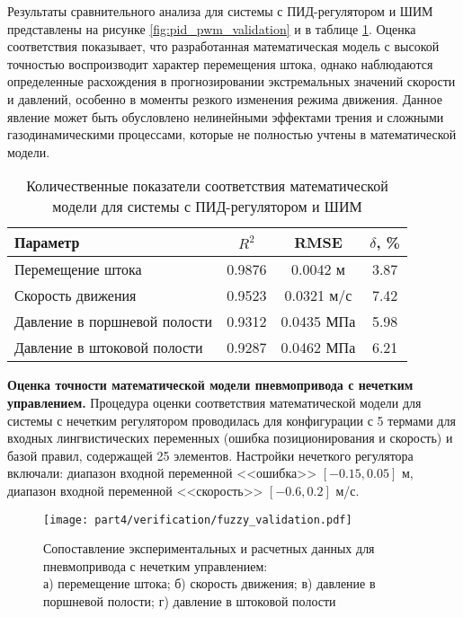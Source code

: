 Результаты сравнительного анализа для системы с ПИД-регулятором и ШИМ представлены на рисунке \ref{fig:pid_pwm_validation} и в таблице \ref{tab:pid_pwm_validation}. Оценка соответствия показывает, что разработанная математическая модель с высокой точностью воспроизводит характер перемещения штока, однако наблюдаются определенные расхождения в прогнозировании экстремальных значений скорости и давлений, особенно в моменты резкого изменения режима движения. Данное явление может быть обусловлено нелинейными эффектами трения и сложными газодинамическими процессами, которые не полностью учтены в математической модели.

\begin{table}[ht]
	\centering
	\caption{Количественные показатели соответствия математической модели для системы с ПИД-регулятором и ШИМ}
	\small
	\label{tab:pid_pwm_validation}
	\begin{tabular}{lccc}
		\hline
		\textbf{Параметр}            & $R^2$        & RMSE             & $\delta$, \% \\
		\hline
		Перемещение штока            & \num{0.9876} & \num{0.0042} м   & \num{3.87}   \\
		Скорость движения            & \num{0.9523} & \num{0.0321} м/с & \num{7.42}   \\
		Давление в поршневой полости & \num{0.9312} & \num{0.0435} МПа & \num{5.98}   \\
		Давление в штоковой полости  & \num{0.9287} & \num{0.0462} МПа & \num{6.21}   \\
		\hline
	\end{tabular}
\end{table}

\textbf{Оценка точности математической модели пневмопривода с нечетким управлением.}
Процедура оценки соответствия математической модели для системы с
нечетким регулятором проводилась для конфигурации с 5 термами для входных
лингвистических переменных (ошибка позиционирования и скорость) и базой правил,
содержащей 25 элементов. Настройки нечеткого регулятора включали: диапазон входной
переменной <<ошибка>> $[\num{-0.15}, \num{0.05}]$ м, диапазон входной переменной <<скорость>> $[\num{-0.6}, \num{0.2}]$ м/с.

\begin{figure}[ht]
	\centering
	\texttt{[image: part4/verification/fuzzy\_validation.pdf]}
	\caption{Сопоставление экспериментальных и расчетных данных для пневмопривода
		с нечетким управлением:\\ а) перемещение штока;
		б) скорость движения; в) давление в поршневой полости;
		г) давление в штоковой полости}
	\label{fig:fuzzy_validation}
\end{figure}

